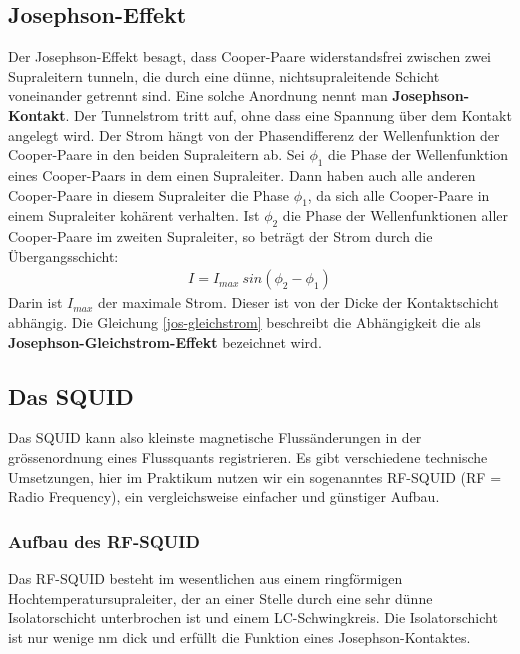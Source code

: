 \documentclass[12pt]{article}
\begin{document}
\subsection{Josephson-Effekt}
\label{josephson}

Der Josephson-Effekt besagt, dass Cooper-Paare widerstandsfrei zwischen zwei Supraleitern tunneln, die durch eine dünne, nichtsupraleitende Schicht voneinander getrennt sind. Eine solche Anordnung nennt man \textbf{Josephson-Kontakt}. Der Tunnelstrom tritt auf, ohne dass eine Spannung über dem Kontakt angelegt wird. Der Strom hängt von der Phasendifferenz der Wellenfunktion der Cooper-Paare in den beiden Supraleitern ab. Sei $\phi_1$ die Phase der Wellenfunktion eines Cooper-Paars in dem einen Supraleiter. Dann haben auch alle anderen Cooper-Paare in diesem Supraleiter die Phase $\phi_1$, da sich alle Cooper-Paare in einem Supraleiter kohärent verhalten. Ist $\phi_2$ die Phase der Wellenfunktionen aller Cooper-Paare im zweiten Supraleiter, so beträgt der Strom durch die Übergangsschicht:
\begin{align}
\label{jos-gleichstrom}
 I = I_{max}~sin(\phi_2 - \phi_1)
\end{align}
Darin ist $I_{max}$ der maximale Strom. Dieser ist von der Dicke der Kontaktschicht abhängig. Die Gleichung \ref{jos-gleichstrom} beschreibt die Abhängigkeit die als \textbf{Josephson-Gleichstrom-Effekt} bezeichnet wird.


\subsection{Das SQUID}

Das SQUID kann also kleinste magnetische Flussänderungen in der grössenordnung eines Flussquants registrieren. Es gibt verschiedene technische Umsetzungen, hier im Praktikum  nutzen wir ein sogenanntes RF-SQUID (RF = Radio Frequency),  ein vergleichsweise einfacher und günstiger Aufbau.
\newpage
\subsubsection{Aufbau des RF-SQUID}

Das RF-SQUID besteht im wesentlichen aus einem ringförmigen Hochtemperatursupraleiter, der an einer Stelle durch eine sehr dünne Isolatorschicht unterbrochen ist und einem LC-Schwingkreis. Die Isolatorschicht ist nur wenige nm dick  und erfüllt die Funktion eines Josephson-Kontaktes.
\end{document}
